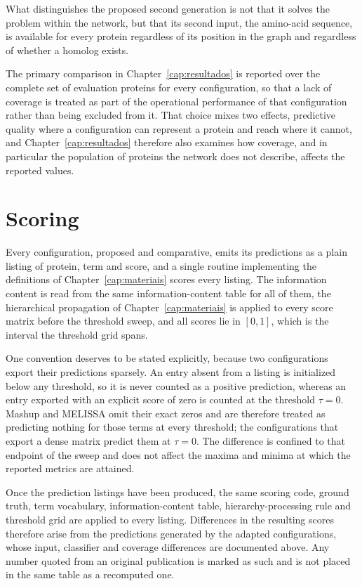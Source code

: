 \documentclass[Ingles]{ic-tese-v3}
\begin{document}
\begin{appendices}{}
What distinguishes the proposed second generation is not that it solves the problem within the
network, but that its second input, the amino-acid sequence, is available for every protein
regardless of its position in the graph and regardless of whether a homolog exists.

The primary comparison in Chapter~\ref{cap:resultados} is reported over the complete set of
evaluation proteins for every configuration, so that a lack of coverage is treated as part of the
operational performance of that configuration rather than being excluded from it. That choice mixes
two effects, predictive quality where a configuration can represent a protein and reach where it
cannot, and Chapter~\ref{cap:resultados} therefore also examines how coverage, and in particular the
population of proteins the network does not describe, affects the reported values.

\section{Scoring}
\label{ape:metricas}

Every configuration, proposed and comparative, emits its predictions as a plain listing of protein,
term and score, and a single routine implementing the definitions of Chapter~\ref{cap:materiais}
scores every listing. The information content is read from the same information-content table for all of them,
the hierarchical propagation of Chapter~\ref{cap:materiais} is applied to every score matrix before
the threshold sweep, and all scores lie in $[0,1]$, which is the interval the threshold grid spans.

One convention deserves to be stated explicitly, because two configurations export their predictions
sparsely. An entry absent from a listing is initialized below any threshold, so it is never counted
as a positive prediction, whereas an entry exported with an explicit score of zero is counted at the
threshold $\tau = 0$. Mashup and MELISSA omit their exact zeros and are therefore treated as
predicting nothing for those terms at every threshold; the configurations that export a dense matrix
predict them at $\tau = 0$. The difference is confined to that endpoint of the sweep and does not
affect the maxima and minima at which the reported metrics are attained.

Once the prediction listings have been produced, the same scoring code, ground truth, term
vocabulary, information-content table, hierarchy-processing rule and threshold grid are applied to
every listing. Differences in the resulting scores therefore arise from the predictions generated by
the adapted configurations, whose input, classifier and coverage differences are documented above.
Any number quoted from an original publication is marked as such and is not placed in the same table
as a recomputed one.


\end{appendices}
\end{document}
